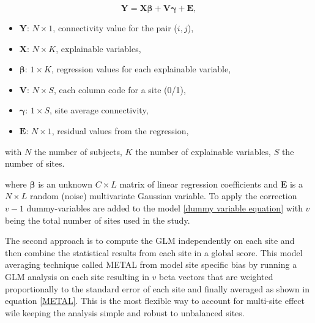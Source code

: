 \documentclass[authoryear]{elsarticle}
\begin{document}
 \begin{equation}
 \label{eq_glm}
  \mathbf{Y} = \mathbf{X}\mathbf{\beta} + \mathbf{V}\mathbf{\gamma}+ \mathbf{E},
 \end{equation}
 \begin{itemize}
  \item $\mathbf{Y}$: $N\times 1$, connectivity value for the pair ($i,j$),
  \item $\mathbf{X}$: $N\times K$, explainable variables,
  \item $\mathbf{\beta}$: $1 \times K$, regression values for each explainable variable,
  \item $\mathbf{V}$: $N\times S$, each column code for a site (0/1),
  \item $\mathbf{\gamma}$: $1\times S$, site average connectivity,
  \item $\mathbf{E}$: $N\times 1$, residual values from the regression,
 \end{itemize}
with $N$ the number of subjects, $K$ the number of explainable variables, $S$ the number of sites.

where $\mathbf{\beta}$ is an unknown $C\times L$ matrix of linear regression coefficients and $\mathbf{E}$ is a $N\times L$ random (noise) multivariate Gaussian variable. %
To apply the correction $v-1$ dummy-variables are added to the model \ref{dummy variable equation} with $v$ being the total number of sites used in the study.

The second approach is to compute the GLM independently on each site and then combine the statistical results from each site in a global score. This model averaging technique called METAL from \cite{Willer2010} model site specific bias by running a GLM analysis on each site resulting in $v$ beta vectors that are weighted proportionally to the standard error of each site and finally averaged as shown in equation \ref{METAL}. This is the most flexible way to account for multi-site effect wile keeping the analysis simple and robust to unbalanced sites.
\end{document}
